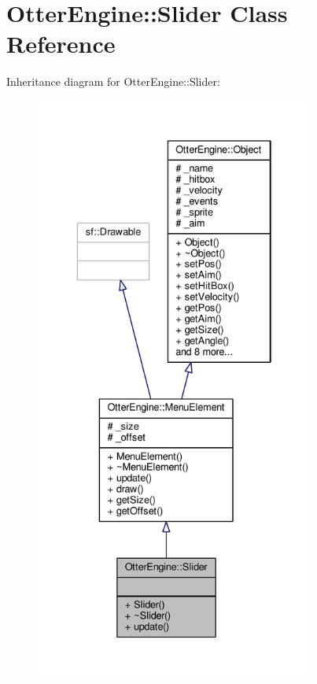 \hypertarget{class_otter_engine_1_1_slider}{}\section{Otter\+Engine\+:\+:Slider Class Reference}
\label{class_otter_engine_1_1_slider}


Inheritance diagram for Otter\+Engine\+:\+:Slider\+:\nopagebreak
\begin{figure}[H]
\begin{center}
\leavevmode
\includegraphics[height=550pt]{d0/d25/class_otter_engine_1_1_slider__inherit__graph}
\end{center}
\end{figure}


